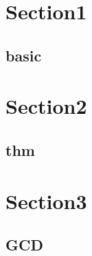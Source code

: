 \section{Section1}
    \subsection{basic}
        

\section{Section2}
    \subsection{thm}
        
        
\section{Section3}
    \subsection{GCD}
        